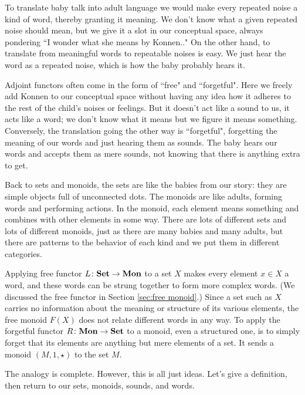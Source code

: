 \documentclass{book}
\def\to{\rightarrow}
\def\taking{\colon}
\def\Mon{{\bf Mon}}
\def\Set{{\bf Set}}
\theoremstyle{remark}
\theoremstyle{definition}
\begin{document}
To translate baby talk into adult language we would make every repeated noise a kind of word, thereby granting it meaning. We don't know what a given repeated noise should mean, but we give it a slot in our conceptual space, always pondering ``I wonder what she means by Konnen.." On the other hand, to translate from meaningful words to repeatable noises is easy. We just hear the word as a repeated noise, which is how the baby probably hears it.

Adjoint functors often come in the form of ``free" and ``forgetful". Here we freely add Konnen to our conceptual space without having any idea how it adheres to the rest of the child's noises or feelings. But it doesn't act like a sound to us, it acts like a word; we don't know what it means but we figure it means something. Conversely, the translation going the other way is ``forgetful", forgetting the meaning of our words and just hearing them as sounds. The baby hears our words and accepts them as mere sounds, not knowing that there is anything extra to get.

Back to sets and monoids, the sets are like the babies from our story: they are simple objects full of unconnected dots. The monoids are like adults, forming words and performing actions. In the monoid, each element means something and combines with other elements in some way. There are lots of different sets and lots of different monoids, just as there are many babies and many adults, but there are patterns to the behavior of each kind and we put them in different categories.

Applying free functor $L\taking\Set\to\Mon$ to a set $X$ makes every element $x\in X$ a word, and these words can be strung together to form more complex words. (We discussed the free functor in Section \ref{sec:free monoid}.) Since a set such as $X$ carries no information about the meaning or structure of its various elements, the free monoid $F(X)$ does not relate different words in any way. To apply the forgetful functor $R\taking\Mon\to\Set$ to a monoid, even a structured one, is to simply forget that its elements are anything but mere elements of a set. It sends a monoid $(M,1,\star)$ to the set $M$. 

The analogy is complete. However, this is all just ideas. Let's give a definition, then return to our sets, monoids, sounds, and words.
\end{document}
